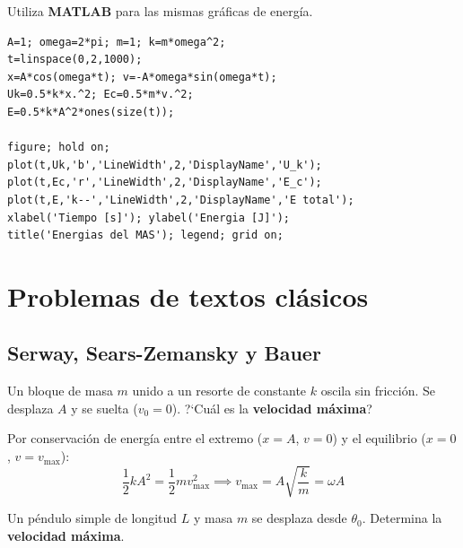 \documentclass[12pt, a4paper, oneside]{book}
\begin{document}
\begin{problema}[title={Problema~12}]
Utiliza \textbf{MATLAB} para las mismas gr\'aficas de energ\'ia.
\end{problema}

\begin{solucion}
\begin{lstlisting}[style=matlab, caption={Gr\'aficas de energ\'ia --- Problema 12}]
A=1; omega=2*pi; m=1; k=m*omega^2;
t=linspace(0,2,1000);
x=A*cos(omega*t); v=-A*omega*sin(omega*t);
Uk=0.5*k*x.^2; Ec=0.5*m*v.^2;
E=0.5*k*A^2*ones(size(t));

figure; hold on;
plot(t,Uk,'b','LineWidth',2,'DisplayName','U_k');
plot(t,Ec,'r','LineWidth',2,'DisplayName','E_c');
plot(t,E,'k--','LineWidth',2,'DisplayName','E total');
xlabel('Tiempo [s]'); ylabel('Energia [J]');
title('Energias del MAS'); legend; grid on;
\end{lstlisting}
\end{solucion}

\chapter{Problemas de textos cl\'asicos}

\section{Serway, Sears-Zemansky y Bauer}

\begin{problema}[title={Problema~13 --- Serway}]
Un bloque de masa $m$ unido a un resorte de constante $k$ oscila sin fricci\'on.
Se desplaza $A$ y se suelta ($v_{0}=0$). ?`Cu\'al es la \textbf{velocidad m\'axima}?
\end{problema}

\begin{solucion}
Por conservaci\'on de energ\'ia entre el extremo ($x=A$, $v=0$) y el equilibrio
($x=0$, $v=v_{\max}$):
\[
  \dfrac{1}{2}kA^{2} = \dfrac{1}{2}mv_{\max}^{2}
  \implies
  \boxed{v_{\max} = A\sqrt{\dfrac{k}{m}} = \omega A}
\]
\end{solucion}

\begin{problema}[title={Problema~14 --- Sears \& Zemansky}]
Un p\'endulo simple de longitud $L$ y masa $m$ se desplaza desde $\theta_{0}$.
Determina la \textbf{velocidad m\'axima}.
\end{problema}
\end{document}
